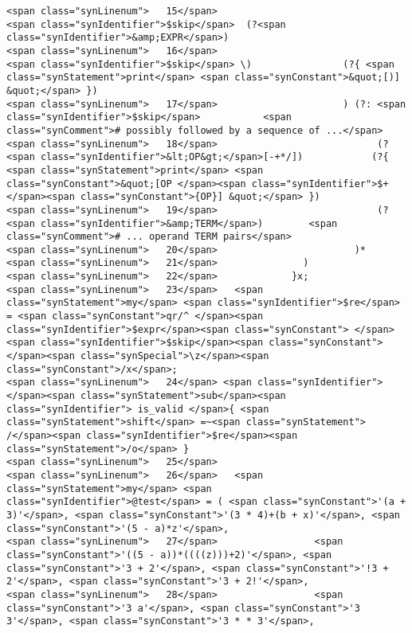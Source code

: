 \begin{verbatim}
<span class="synLinenum">   15</span>                             <span class="synIdentifier">$skip</span>  (?<span class="synIdentifier">&amp;EXPR</span>)
<span class="synLinenum">   16</span>                             <span class="synIdentifier">$skip</span> \)                (?{ <span class="synStatement">print</span> <span class="synConstant">&quot;[)] &quot;</span> })
<span class="synLinenum">   17</span>                      ) (?: <span class="synIdentifier">$skip</span>           <span class="synComment"># possibly followed by a sequence of ...</span>
<span class="synLinenum">   18</span>                            (?<span class="synIdentifier">&lt;OP&gt;</span>[-+*/])            (?{ <span class="synStatement">print</span> <span class="synConstant">&quot;[OP </span><span class="synIdentifier">$+</span><span class="synConstant">{OP}] &quot;</span> })
<span class="synLinenum">   19</span>                            (?<span class="synIdentifier">&amp;TERM</span>)        <span class="synComment"># ... operand TERM pairs</span>
<span class="synLinenum">   20</span>                        )*
<span class="synLinenum">   21</span>               )
<span class="synLinenum">   22</span>             }x;
<span class="synLinenum">   23</span>   <span class="synStatement">my</span> <span class="synIdentifier">$re</span> = <span class="synConstant">qr/^ </span><span class="synIdentifier">$expr</span><span class="synConstant"> </span><span class="synIdentifier">$skip</span><span class="synConstant"> </span><span class="synSpecial">\z</span><span class="synConstant">/x</span>;
<span class="synLinenum">   24</span> <span class="synIdentifier">  </span><span class="synStatement">sub</span><span class="synIdentifier"> is_valid </span>{ <span class="synStatement">shift</span> =~<span class="synStatement"> /</span><span class="synIdentifier">$re</span><span class="synStatement">/o</span> }
<span class="synLinenum">   25</span> 
<span class="synLinenum">   26</span>   <span class="synStatement">my</span> <span class="synIdentifier">@test</span> = ( <span class="synConstant">'(a + 3)'</span>, <span class="synConstant">'(3 * 4)+(b + x)'</span>, <span class="synConstant">'(5 - a)*z'</span>,
<span class="synLinenum">   27</span>                 <span class="synConstant">'((5 - a))*((((z)))+2)'</span>, <span class="synConstant">'3 + 2'</span>, <span class="synConstant">'!3 + 2'</span>, <span class="synConstant">'3 + 2!'</span>,
<span class="synLinenum">   28</span>                 <span class="synConstant">'3 a'</span>, <span class="synConstant">'3 3'</span>, <span class="synConstant">'3 * * 3'</span>,

\end{verbatim}
